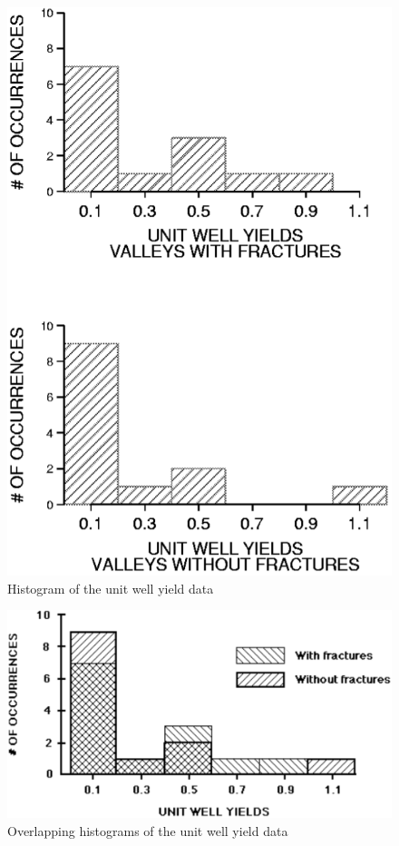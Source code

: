 \documentclass[]{book}
\begin{document}
\begin{figure}

{\centering \includegraphics[width=8.6in]{figures/2_15} 

}

\caption{Histogram of the unit well yield data}\label{fig:fig-2-15}
\end{figure}
\begin{figure}

{\centering \includegraphics[width=15.83in]{figures/2_16} 

}

\caption{Overlapping histograms of the unit well yield data}\label{fig:fig-2-16}
\end{figure}
\end{document}
